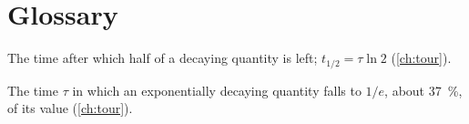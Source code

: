 \chapter{Glossary}
\label{app:glossary}

\begin{description}[leftmargin=!,labelwidth=3.4cm,font=\sffamily\bfseries\color{navy},itemsep=1.5pt]
  \item[Half-life] The time after which half of a decaying quantity is left; $t_{1/2}=\tau\ln 2$ (\cref{ch:tour}).
  \item[Time constant] The time $\tau$ in which an exponentially decaying quantity falls to $1/e$, about
        \qty{37}{\percent}, of its value (\cref{ch:tour}).
\end{description}

